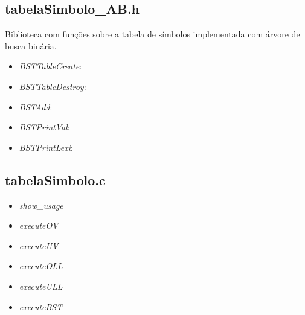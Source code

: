 \documentclass[12pt, a4paper]{article} %
\begin{document}
	\subsection{tabelaSimbolo\_AB.h}
		Biblioteca com funções sobre a tabela de símbolos implementada com árvore de busca binária.
		\begin{itemize}
			\item \textit{BSTTableCreate}:
			\item \textit{BSTTableDestroy}:
			\item \textit{BSTAdd}:
			\item \textit{BSTPrintVal}:
			\item \textit{BSTPrintLexi}:
		\end{itemize}
	\subsection{tabelaSimbolo.c} %
		\begin{itemize}
			\item \textit{show\_usage}
			\item \textit{executeOV}
			\item \textit{executeUV}
			\item \textit{executeOLL}
			\item \textit{executeULL}
			\item \textit{executeBST}
		\end{itemize}
\end{document}
